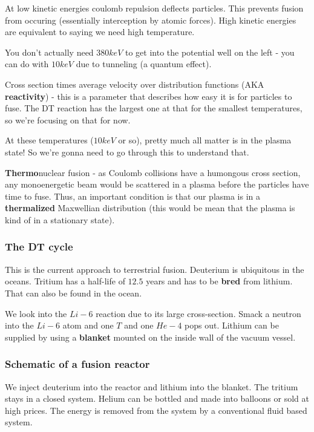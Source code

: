 \documentclass[PlasmaNotes.tex]{subfiles}
\begin{document}
At low kinetic energies coulomb repulsion deflects particles. This prevents fusion from occuring (essentially interception by atomic forces). High kinetic energies are equivalent to saying we need high temperature.

You don't actually need $380 keV$ to get into the potential well on the left - you can do with $10 keV$ due to tunneling (a quantum effect).


Cross section times average velocity over distribution functions (AKA \textbf{reactivity}) - this is a parameter that describes how easy it is for particles to fuse. The DT reaction has the largest one at that for the smallest temperatures, so we're focusing on that for now.

At these temperatures ($10 keV$ or so), pretty much all matter is in the plasma state! So we're gonna need to go through this to understand that.

\textbf{Thermo}nuclear fusion - as Coulomb collisions have a humongous cross section, any monoenergetic beam would be scattered in a plasma before the particles have time to fuse. Thus, an important condition is that our plasma is in a \textbf{thermalized} Maxwellian distribution (this would be mean that the plasma is kind of in a stationary state).

\subsubsection{The DT cycle}


This is the current approach to terrestrial fusion. Deuterium is ubiquitous in the oceans. Tritium has a half-life of $12.5$ years and has to be \textbf{bred} from lithium. That can also be found in the ocean.

We look into the $Li-6$ reaction due to its large cross-section. Smack a neutron into the $Li-6$ atom and one $T$ and one $He-4$ pops out. Lithium can be supplied by using a \textbf{blanket} mounted on the inside wall of the vacuum vessel.

\subsubsection{Schematic of a fusion reactor}

We inject deuterium into the reactor and lithium into the blanket. The tritium stays in a closed system. Helium can be bottled and made into balloons or sold at high prices. The energy is removed from the system by a conventional fluid based system.
\end{document}
